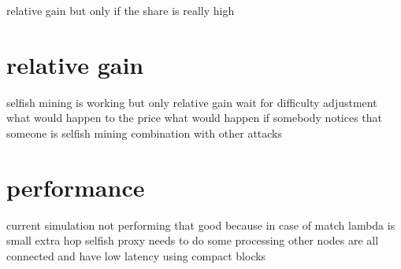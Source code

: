 relative gain but only if the share is really high

\section{relative gain}

selfish mining is working
but only relative gain
wait for difficulty adjustment
what would happen to the price
what would happen if somebody notices that someone is selfish mining
combination with other attacks

\section{performance}

current simulation not performing that good because in case of match lambda is small
extra hop
selfish proxy needs to do some processing
other nodes are all connected and have low latency
using compact blocks

